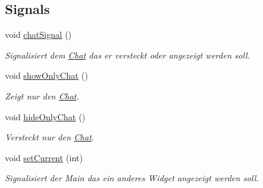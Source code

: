 \subsection*{Signals}
\begin{DoxyCompactItemize}
\item 
void \hyperlink{class_draw_af9ed50b9ec6a3bae6a995a394e6c58e3}{chat\+Signal} ()
\begin{DoxyCompactList}\small\item\em Signalisiert dem \hyperlink{class_chat}{Chat} das er versteckt oder angezeigt werden soll. \end{DoxyCompactList}\item 
void \hyperlink{class_draw_ad2ba543f075871b08e4fb22bcfa00a7f}{show\+Only\+Chat} ()
\begin{DoxyCompactList}\small\item\em Zeigt nur den \hyperlink{class_chat}{Chat}. \end{DoxyCompactList}\item 
void \hyperlink{class_draw_a799aeae3d852fe42b9521f6cef53c41e}{hide\+Only\+Chat} ()
\begin{DoxyCompactList}\small\item\em Versteckt nur den \hyperlink{class_chat}{Chat}. \end{DoxyCompactList}\item 
void \hyperlink{class_draw_a8e1664e9a5bdb18ddfedfe8cbc7e9de3}{set\+Current} (int)
\begin{DoxyCompactList}\small\item\em Signalisiert der Main das ein anderes Widget angezeigt werden soll. \end{DoxyCompactList}\end{DoxyCompactItemize}
